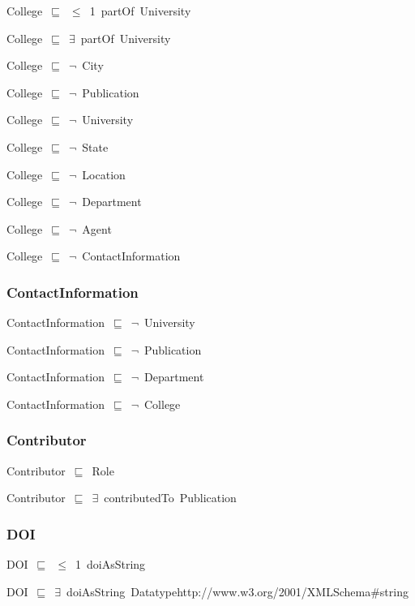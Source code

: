 \documentclass{article}
\begin{document}
College~\ensuremath{\sqsubseteq}~\ensuremath{\leq}~1~partOf~University~

College~\ensuremath{\sqsubseteq}~\ensuremath{\exists}~partOf~University~

College~\ensuremath{\sqsubseteq}~\ensuremath{\lnot}~City

College~\ensuremath{\sqsubseteq}~\ensuremath{\lnot}~Publication

College~\ensuremath{\sqsubseteq}~\ensuremath{\lnot}~University

College~\ensuremath{\sqsubseteq}~\ensuremath{\lnot}~State

College~\ensuremath{\sqsubseteq}~\ensuremath{\lnot}~Location

College~\ensuremath{\sqsubseteq}~\ensuremath{\lnot}~Department

College~\ensuremath{\sqsubseteq}~\ensuremath{\lnot}~Agent

College~\ensuremath{\sqsubseteq}~\ensuremath{\lnot}~ContactInformation

\subsubsection*{ContactInformation}

ContactInformation~\ensuremath{\sqsubseteq}~\ensuremath{\lnot}~University

ContactInformation~\ensuremath{\sqsubseteq}~\ensuremath{\lnot}~Publication

ContactInformation~\ensuremath{\sqsubseteq}~\ensuremath{\lnot}~Department

ContactInformation~\ensuremath{\sqsubseteq}~\ensuremath{\lnot}~College

\subsubsection*{Contributor}

Contributor~\ensuremath{\sqsubseteq}~Role~

Contributor~\ensuremath{\sqsubseteq}~\ensuremath{\exists}~contributedTo~Publication~

\subsubsection*{DOI}

DOI~\ensuremath{\sqsubseteq}~\ensuremath{\leq}~1~doiAsString~

DOI~\ensuremath{\sqsubseteq}~\ensuremath{\exists}~doiAsString~Datatypehttp://www.w3.org/2001/XMLSchema#string~
\end{document}
